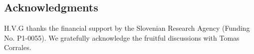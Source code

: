 \documentclass[letterpaper,compsoc,twoside]{IEEEtran}
\begin{document}
\subsection{Acknowledgments%
  \label{acknowledgments}%
}

H.V.G thanks the financial support by the Slovenian Research Agency (Funding No. P1-0055).
We gratefully acknowledge the fruitful discussions with Tomas Corrales. 


\end{document}
